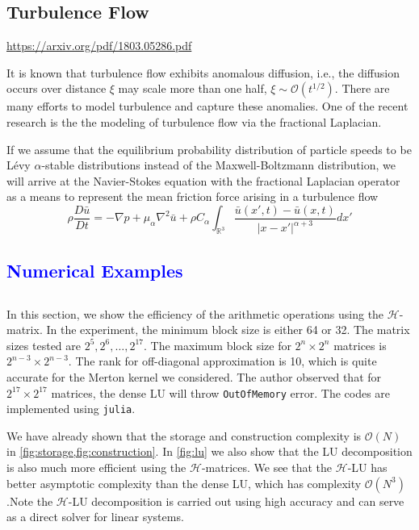 \documentclass[10pt,a4paper]{article}
\newcommand{\RR}[0]{\mathbb{R}}
\newcommand{\lib}[1]{\textcolor{blue}{\section{#1}}}
\theoremstyle{definition}
\begin{document}
\subsection{Turbulence Flow}

\url{https://arxiv.org/pdf/1803.05286.pdf}

It is known that turbulence flow exhibits anomalous diffusion, i.e., the diffusion occurs over distance $\xi$ may scale more than one half, $\xi\sim\mathcal{O}(t^{1/2})$. There are many efforts to model turbulence and capture these anomalies. One of the recent research is the the modeling of turbulence flow via the fractional Laplacian. 

If we assume that the equilibrium probability distribution of particle speeds to be L\'evy $\alpha$-stable distributions instead of the Maxwell-Boltzmann distribution, we will arrive at the Navier-Stokes equation with the fractional Laplacian operator as a means to represent the mean friction force arising in a turbulence flow
\begin{equation}
	\rho\frac{D\bar u}{Dt} = -\nabla p + \mu_\alpha \nabla^2 \bar u + \rho C_\alpha \int_{\RR^3} \frac{\bar u(x',t)-\bar u(x,t)}{|x-x'|^{\alpha+3}} dx'
\end{equation}



\lib{Numerical Examples}

\subsection{}

In this section, we show the efficiency of the arithmetic operations using the $\mathcal{H}$-matrix. In the experiment, the minimum block size is either 64 or 32. The matrix sizes tested are $2^5, 2^6, \ldots, 2^17$. The maximum block size for $2^n\times 2^n$ matrices is $2^{n-3}\times 2^{n-3}$. The rank for off-diagonal approximation is 10, which is quite accurate for the Merton kernel we considered. The author observed that for $2^17\times 2^17$ matrices, the dense LU will throw \texttt{OutOfMemory} error. The codes are implemented using \texttt{julia}. 



We have already shown that the storage and construction complexity is $\mathcal{O}(N)$ in \cref{fig:storage,fig:construction}. In \cref{fig:lu} we also show that the LU decomposition is also much more efficient using the $\mathcal{H}$-matrices. We see that the $\mathcal{H}$-LU has better asymptotic complexity than the dense LU, which has complexity $\mathcal{O}(N^3)$.Note the $\mathcal{H}$-LU decomposition is carried out using high accuracy and can serve as a direct solver for linear systems. 
\end{document}
